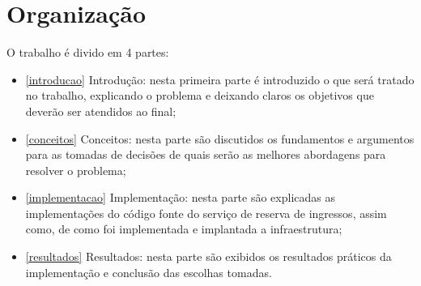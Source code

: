 \section{Organização}

O trabalho é divido em 4 partes:

\begin{itemize}
    \item \autoref{introducao} Introdução: nesta primeira parte é introduzido o que
          será tratado no trabalho, explicando o problema e deixando claros os
          objetivos que deverão ser atendidos ao final;

    \item \autoref{conceitos} Conceitos: nesta parte são discutidos os fundamentos e
          argumentos para as tomadas de decisões de quais serão as melhores
          abordagens para resolver o problema;

    \item \autoref{implementacao} Implementação: nesta parte são explicadas as
          implementações do código fonte do serviço de reserva de ingressos, assim
          como, de como foi implementada e implantada a infraestrutura;

    \item \autoref{resultados} Resultados: nesta parte são exibidos os resultados
          práticos da implementação e conclusão das escolhas tomadas.

\end{itemize}
